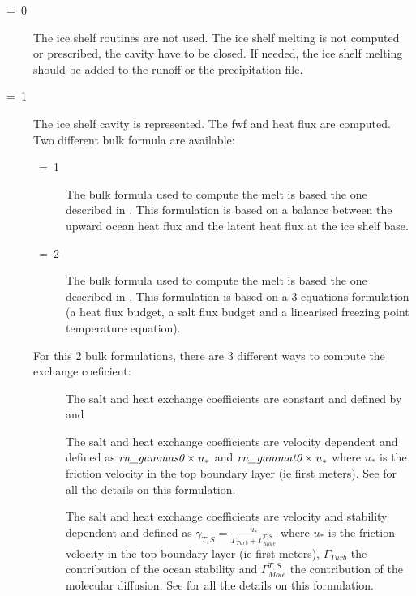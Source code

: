 \documentclass[NEMO_book]{subfiles}
\begin{document}
\begin{description}
\item[~=~0]
The ice shelf routines are not used. The ice shelf melting is not computed or prescribed, the cavity have to be closed. 
If needed, the ice shelf melting should be added to the runoff or the precipitation file.

\item[~=~1]
The ice shelf cavity is represented. The fwf and heat flux are computed. Two different bulk formula are available:
	\begin{description}
	\item[~=~1]
	The bulk formula used to compute the melt is based the one described in \citet{Hunter2006}.
        This formulation is based on a balance between the upward ocean heat flux and the latent heat flux at the ice shelf base.

	\item[~=~2] 
	The bulk formula used to compute the melt is based the one described in \citet{Jenkins1991}.
        This formulation is based on a 3 equations formulation (a heat flux budget, a salt flux budget and a linearised freezing point temperature equation).
	\end{description}

For this 2 bulk formulations, there are 3 different ways to compute the exchange coeficient:
	\begin{description}
        \item[]
	The salt and heat exchange coefficients are constant and defined by  and 

	\item[]
	The salt and heat exchange coefficients are velocity dependent and defined as $\np{rn\_gammas0} \times u_{*}$ and $\np{rn\_gammat0} \times u_{*}$
        where $u_{*}$ is the friction velocity in the top boundary layer (ie first  meters).
        See \citet{Jenkins2010} for all the details on this formulation.
	
	\item[]
	The salt and heat exchange coefficients are velocity and stability dependent and defined as 
        $\gamma_{T,S} = \frac{u_{*}}{\Gamma_{Turb} + \Gamma^{T,S}_{Mole}}$
        where $u_{*}$ is the friction velocity in the top boundary layer (ie first  meters), 
        $\Gamma_{Turb}$ the contribution of the ocean stability and 
        $\Gamma^{T,S}_{Mole}$ the contribution of the molecular diffusion.
        See \citet{Holland1999} for all the details on this formulation.
        \end{description}


\end{description}
\end{document}
